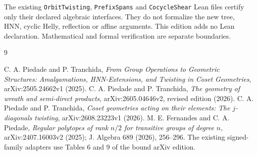 The existing \texttt{OrbitTwisting}, \texttt{PrefixSpans} and \texttt{CocycleShear} Lean files certify only their declared algebraic interfaces. They do not formalize the new tree, HNN, cyclic Helly, reflection or affine arguments. This edition adds no Lean declaration. Mathematical and formal verification are separate boundaries.
\begin{thebibliography}{9}\raggedright
{} C. A. Piedade and P. Tranchida, \emph{From Group Operations to Geometric Structures: Amalgamations, HNN-Extensions, and Twisting in Coset Geometries}, arXiv:2505.24662v1 (2025).
 C. A. Piedade and P. Tranchida, \emph{The geometry of wreath and semi-direct products}, arXiv:2605.04646v2, revised edition (2026).
 C. A. Piedade and P. Tranchida, \emph{Coset geometries acting on their elements: The $j$-diagonals twisting}, arXiv:2608.23223v1 (2026).
 M. E. Fernandes and C. A. Piedade, \emph{Regular polytopes of rank $n/2$ for transitive groups of degree $n$}, arXiv:2407.16003v2 (2025); J. Algebra 689 (2026), 256--296. The existing signed-family adapters use Tables 6 and 9 of the bound arXiv edition.
\end{thebibliography}

